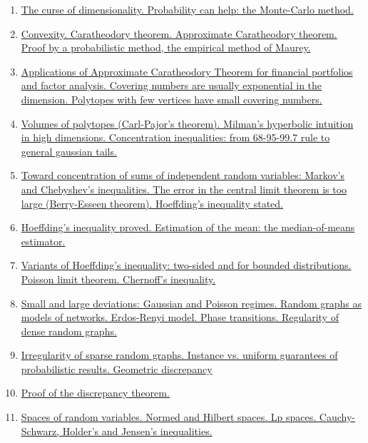 \documentclass[11pt]{article}
\begin{document}
\begin{enumerate}
	\item \href{https://mp.weixin.qq.com/s/v3Z1f20z1hDrn-8dI-CbAA}{The curse of dimensionality. Probability can help: the Monte-Carlo method.}	%
	\item \href{https://mp.weixin.qq.com/s/J9gdJ2KR9ugcl_XI8oARIA}{Convexity. Caratheodory theorem. Approximate Caratheodory theorem. Proof by a probabilistic method, the empirical method of Maurey.}	%
	\item \href{https://mp.weixin.qq.com/s/Z8loFJ5IB2Ix6rCsVfOYLg}{Applications of Approximate Caratheodory Theorem for financial portfolios and factor analysis. Covering numbers are usually exponential in the dimension. Polytopes with few vertices have small covering numbers.}	%
	\item \href{https://mp.weixin.qq.com/s/iuRjK1di20saIzcViawKJg}{Volumes of polytopes (Carl-Pajor's theorem). Milman's hyperbolic intuition in high dimensions. Concentration inequalities: from 68-95-99.7 rule to general gaussian tails.}	%
	\item \href{https://mp.weixin.qq.com/s/qMDUAUcbDE4PFA5llETOAA}{Toward concentration of sums of independent random variables: Markov's and Chebyshev's inequalities. The error in the central limit theorem is too large (Berry-Esseen theorem). Hoeffding's inequality stated.}	%
	\item \href{https://mp.weixin.qq.com/s/Mcvox5IucpjtH86YS_qP1A}{Hoeffding's inequality proved. Estimation of the mean: the median-of-means estimator.}	%
	\item \href{https://mp.weixin.qq.com/s/l6h6PBCBB49-vifUMrmVtg}{Variants of Hoeffding's inequality: two-sided and for bounded distributions. Poisson limit theorem. Chernoff's inequality.}	%
	\item \href{https://mp.weixin.qq.com/s/WyxwqC0bUX3_TDTcwJ8mGQ}{Small and large deviations: Gaussian and Poisson regimes. Random graphs as models of networks. Erdos-Renyi model. Phase transitions. Regularity of dense random graphs.}	%
	\item \href{https://mp.weixin.qq.com/s/5864YkuQoSAQIq_3kdBMTA}{Irregularity of sparse random graphs. Instance vs. uniform guarantees of probabilistic results. Geometric discrepancy}	%
	\item \href{https://mp.weixin.qq.com/s/jswkml_DDPueAIM_X3g7Xw}{Proof of the discrepancy theorem.}	%
	\item \href{https://mp.weixin.qq.com/s/JYJcLdB9Ltz8W8p2dFgGBQ}{Spaces of random variables. Normed and Hilbert spaces. Lp spaces. Cauchy-Schwarz, Holder's and Jensen's inequalities.}	%

\end{enumerate}
\end{document}

